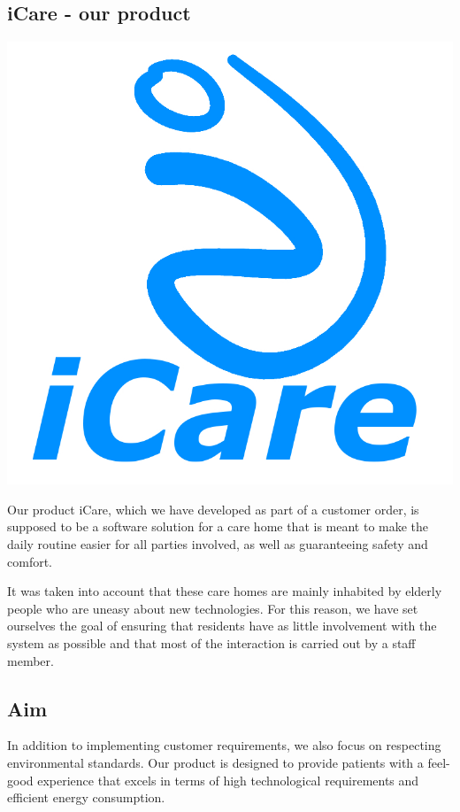 \documentclass
[
 11pt, %
       DIV12,
       a4paper,
       oneside,
       parskip=half,
       headings=normal,
       bibliography=totoc,
       index=totoc,
       captions=tableheading,
       ]{article}
\begin{document}
\subsection{iCare - our product}
\label{sec:org6de4d3a}
\begin{center}
\includegraphics[width=.9\linewidth]{./content/iCare.jpeg}
\end{center}
Our product iCare, which we have developed as part of a customer order, is
supposed to be a software solution for a care home that is meant to make the
daily routine easier for all parties involved, as well as guaranteeing safety
and comfort.

It was taken into account that these care homes are mainly inhabited by elderly
people who are uneasy about new technologies. For this reason, we have set
ourselves the goal of ensuring that residents have as little involvement with
the system as possible and that most of the interaction is carried out by a
staff member.


\subsection{Aim}
\label{sec:orgf4620bb}
In addition to implementing customer requirements, we also focus on respecting
environmental standards. Our product is designed to provide patients with a
feel-good experience that excels in terms of high technological requirements and
efficient energy consumption.
\end{document}
